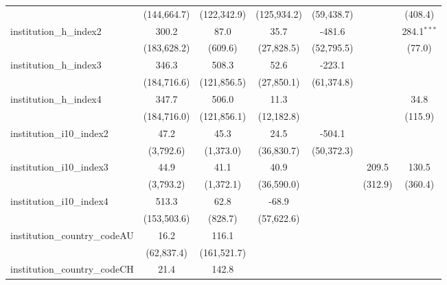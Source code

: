 \begin{tabular}{lcccccc}
                                         & (144,664.7)  & (122,342.9)   & (125,934.2) & (59,438.7)    &                & (408.4)\\   
   institution\_h\_index2                & 300.2        & 87.0          & 35.7        & -481.6        &                & 284.1$^{***}$\\   
                                         & (183,628.2)  & (609.6)       & (27,828.5)  & (52,795.5)    &                & (77.0)\\   
   institution\_h\_index3                & 346.3        & 508.3         & 52.6        & -223.1        &                &   \\   
                                         & (184,716.6)  & (121,856.5)   & (27,850.1)  & (61,374.8)    &                &   \\   
   institution\_h\_index4                & 347.7        & 506.0         & 11.3        &               &                & 34.8\\   
                                         & (184,716.0)  & (121,856.1)   & (12,182.8)  &               &                & (115.9)\\   
   institution\_i10\_index2              & 47.2         & 45.3          & 24.5        & -504.1        &                &   \\   
                                         & (3,792.6)    & (1,373.0)     & (36,830.7)  & (50,372.3)    &                &   \\   
   institution\_i10\_index3              & 44.9         & 41.1          & 40.9        &               & 209.5          & 130.5\\   
                                         & (3,793.2)    & (1,372.1)     & (36,590.0)  &               & (312.9)        & (360.4)\\   
   institution\_i10\_index4              & 513.3        & 62.8          & -68.9       &               &                &   \\   
                                         & (153,503.6)  & (828.7)       & (57,622.6)  &               &                &   \\   
   institution\_country\_codeAU          & 16.2         & 116.1         &             &               &                &   \\   
                                         & (62,837.4)   & (161,521.7)   &             &               &                &   \\   
   institution\_country\_codeCH          & 21.4         & 142.8         &             &               &                &   \\   

\end{tabular}
